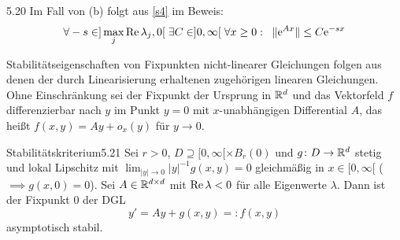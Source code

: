 \documentclass[a4paper]{article}
\begin{document}
\begin{Bemerkung}{}{5.20}
Im Fall von (b) folgt aus \eqref{s4} im Beweis:
\[\forall -s\in ]\max_j\operatorname{\textrm{Re}}\lambda_j,0[\;\exists C\in]0,\infty[\;\forall x\ge0:\;\;\|\mathrm{e}^{Ax}\|\le C\mathrm{e}^{-sx}\]
\end{Bemerkung}

Stabilitätseigenschaften von Fixpunkten nicht-linearer Gleichungen folgen aus denen der durch Linearisierung erhaltenen zugehörigen linearen Gleichungen. Ohne Einschränkung sei der Fixpunkt der Ursprung in $\mathbb R^d$ und das Vektorfeld $f$ differenzierbar nach $y$ im Punkt $y=0$ mit $x$-unabhängigen Differential $A$, das heißt $f(x,y)=Ay+o_x(y)$ für $y\to 0$.

\begin{Satz}{Stabilitätskriterium}{5.21}
Sei $r>0$, $D\supseteq [0,\infty[\times B_r(0)$ und $g\colon D\to\mathbb R^d$ stetig und lokal Lipschitz mit $\lim_{|y|\to0}|y|^{-1}g(x,y)=0$ gleichmäßig in $x\in [0,\infty[$ ($\implies g(x,0)=0$). Sei $A\in \mathbb R^{d\times d}$ mit $\operatorname{\textrm{Re}} \lambda<0$ für alle Eigenwerte $\lambda$. Dann ist der Fixpunkt 0 der DGL 
\[y'=Ay+g(x,y)=:f(x,y)\]
asymptotisch stabil.
\end{Satz}
\end{document}
